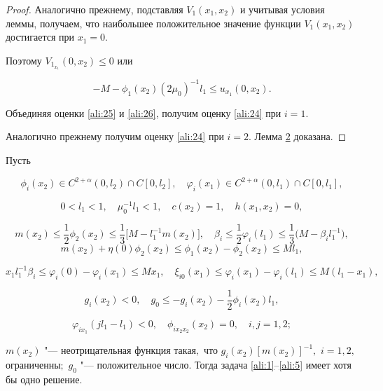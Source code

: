 \begin{proof}
Аналогично прежнему, подставляя $V_1(x_1,x_2)$ и учитывая условия леммы, получаем, что наибольшее положительное значение функции $V_1(x_1,x_2)$ достигается при $x_1=0$. 

Поэтому $V_{1_{x_1}}(0,x_2)\le0$ или

\begin{equation}

\label{ali:26}

-M-\phi_1(x_2)(2\mu_0)^{-1}l_1\le u_{x_1}(0, x_2).

\end{equation}



Объединяя оценки \eqref{ali:25} и \eqref{ali:26}, получим оценку \eqref{ali:24} при $i=1$. 

Аналогично прежнему получим оценку \eqref{ali:24} при $i=2$. Лемма \hyperlink{ali:lemma2}{2} доказана. 

\end{proof}



\smallskip



\hypertarget{ali:thm3}{}



\begin{theorem}[3]Пусть 

$$\phi_i(x_2)\in C^{2+\alpha}(0, l_2)\cap C[0, l_2],\quad \varphi_i(x_1)\in C^{2+\alpha}(0, l_1)\cap C[0, l_1],$$ 

$$0<l_1<1, \quad \mu_0^{-1}l_1<1,\quad c(x_2)=1,\quad h(x_1,x_2)=0,$$  

$$m(x_2)\le\frac{1}{2}\phi_2(x_2)\le\frac{1}{3}\bigl[M- l_1^{-1} m(x_2)\bigr],\quad 

\beta_i\le\frac{1}{2}\varphi_i(l_1)\le\frac{1}{3}\bigl(M-\beta_il_1^{-1}\bigr),$$ $$m(x_2)+\eta(0)\phi_2(x_2)\le\phi_1(x_2)-\phi_2(x_2)\le Ml_1,$$ 

$$x_1l_1^{-1}\beta_i\le\varphi_i(0)-\varphi_i(x_1)\le Mx_1,\quad \xi_{i0}(x_1)\le\varphi_i(x_1)-\varphi_i(l_1)\le M(l_1-x_1),$$ 

$$g_i(x_2)<0,\quad g_0\le-g_i(x_2)-\frac{1}{2}\phi_i(x_2)l_1,$$ 

$$\varphi_{ix_1}(jl_1-l_1)<0,\quad \phi_{ix_2x_2}(x_2)=0,\quad i, j=1, 2;$$ 

$m(x_2)$ "--- неотрицательная функция такая$,$ что $g_i(x_2)[m(x_2)]^{-1},$ $i=1, 2,$ огра\-ни\-ченны$;$ $g_0$ "--- положительное число{\rm .} Тогда задача \eqref{ali:1}--\eqref{ali:5} имеет хотя бы одно решение{\rm .}

\end{theorem} 



